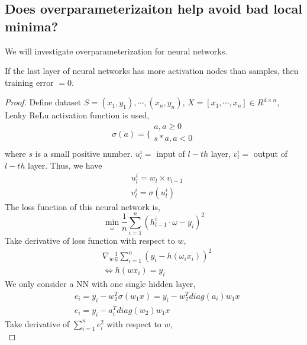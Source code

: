 \documentclass[12pt]{report}
\begin{document}
\subsection{Does overparameterizaiton help avoid bad local minima?}
We will investigate overparameterization for neural networks.
\begin{theorem}
	\label{Thm::nn}
	If the last layer of neural networks has more activation nodes than samples, then training error $=0$. 
\end{theorem}\cite{soudry2016no}
\begin{proof}
	Define dataset $S = {(x_1, y_1), \cdots, (x_n, y_n)}$, $X = [x_1, \cdots, x_n] \in R^{d \times n}$, Leaky ReLu activation function is used,
	\[
	\sigma (a) = \{\begin{array}{lr}
	a, a \geq 0 \\
	s*a, a < 0 \\
	\end{array}
	\]
	where $s$ is a small positive number. $u_l^{i} = $ input of $l-th$ layer,
	$v_l^{i} = $ output of $l-th$ layer. Thus, we have 
	\begin{equation}
	\begin{split}
	& u_l^{i} = w_l \times v_{l - 1} \\
	& v_l^{i} = \sigma(u_l^i)
	\end{split}
	\end{equation}
	The loss function of this neural network is, 
	\begin{equation}
	\min_{\omega}\frac{1}{n}\sum_{i = 1}^{n}(h_{l - 1}^i \cdot \omega - y_i)^2
	\end{equation}
	Take derivative of loss function with respect to $w$,
	\begin{equation}
	\begin{split}
	& \nabla_{w} \frac{1}{n}\sum_{i = 1}^{n}(y_i - h(\omega_i x_i))^2\\
	& \Longleftrightarrow h(w x_i) = y_i
	\end{split}
	\end{equation}
	We only consider a NN with one single hidden layer,
	\begin{equation}
	\begin{split}
	& e_i = y_i - w_2^T\sigma(w_1x) = y_i - w_2^T diag(a_i)w_1x \\
	& e_i = y_i - a_i^T diag(w_2)w_1x
	\end{split}
	\end{equation}
	Take derivative of $\sum_{i = 1}^{n}e_i^2$ with respect to $w$,
	\begin{equation}

\end{equation}
\end{proof}
\end{document}
